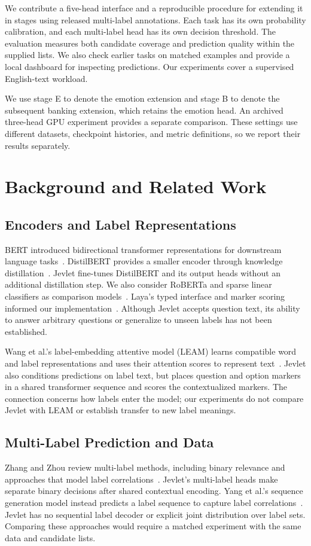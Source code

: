 \documentclass[conference]{IEEEtran}
\begin{document}
We contribute a five-head interface and a reproducible procedure for extending it in stages using released multi-label annotations. Each task has its own probability calibration, and each multi-label head has its own decision threshold. The evaluation measures both candidate coverage and prediction quality within the supplied lists. We also check earlier tasks on matched examples and provide a local dashboard for inspecting predictions. Our experiments cover a supervised English-text workload.

We use stage E to denote the emotion extension and stage B to denote the subsequent banking extension, which retains the emotion head. An archived three-head GPU experiment provides a separate comparison. These settings use different datasets, checkpoint histories, and metric definitions, so we report their results separately.

\section{Background and Related Work}
\subsection{Encoders and Label Representations}
BERT introduced bidirectional transformer representations for downstream language tasks~\cite{bert}. DistilBERT provides a smaller encoder through knowledge distillation~\cite{distilbert}. Jevlet fine-tunes DistilBERT and its output heads without an additional distillation step. We also consider RoBERTa and sparse linear classifiers as comparison models~\cite{roberta,svm}. Laya's typed interface and marker scoring informed our implementation~\cite{laya}. Although Jevlet accepts question text, its ability to answer arbitrary questions or generalize to unseen labels has not been established.

Wang et al.'s label-embedding attentive model (LEAM) learns compatible word and label representations and uses their attention scores to represent text~\cite{leam}. Jevlet also conditions predictions on label text, but places question and option markers in a shared transformer sequence and scores the contextualized markers. The connection concerns how labels enter the model; our experiments do not compare Jevlet with LEAM or establish transfer to new label meanings.

\subsection{Multi-Label Prediction and Data}
Zhang and Zhou review multi-label methods, including binary relevance and approaches that model label correlations~\cite{multilabel_review}. Jevlet's multi-label heads make separate binary decisions after shared contextual encoding. Yang et al.'s sequence generation model instead predicts a label sequence to capture label correlations~\cite{sgm}. Jevlet has no sequential label decoder or explicit joint distribution over label sets. Comparing these approaches would require a matched experiment with the same data and candidate lists.
\end{document}
